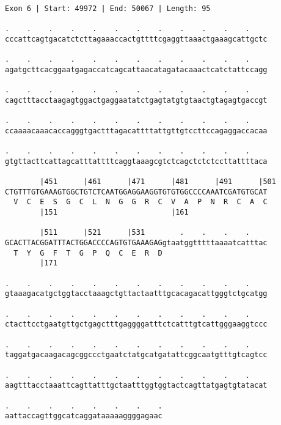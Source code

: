 \documentclass{article}
\begin{document}
\begin{Verbatim}
Exon 6 | Start: 49972 | End: 50067 | Length: 95
 
.    .    .    .    .    .    .    .    .    .    .    .    
cccattcagtgacatctcttagaaaccactgttttcgaggttaaactgaaagcattgctc
  
.    .    .    .    .    .    .    .    .    .    .    .    
agatgcttcacggaatgagaccatcagcattaacatagatacaaactcatctattccagg
  
.    .    .    .    .    .    .    .    .    .    .    .    
cagctttacctaagagtggactgaggaatatctgagtatgtgtaactgtagagtgaccgt
  
.    .    .    .    .    .    .    .    .    .    .    .    
ccaaaacaaacaccagggtgactttagacattttattgttgtccttccagaggaccacaa
  
.    .    .    .    .    .    .    .    .    .    .    .    
gtgttacttcattagcatttattttcaggtaaagcgtctcagctctctccttattttaca
  
        |451      |461      |471      |481      |491      |501
CTGTTTGTGAAAGTGGCTGTCTCAATGGAGGAAGGTGTGTGGCCCCAAATCGATGTGCAT
  V  C  E  S  G  C  L  N  G  G  R  C  V  A  P  N  R  C  A  C
        |151                          |161                  
  
        |511      |521      |531        .    .    .    .    
GCACTTACGGATTTACTGGACCCCAGTGTGAAAGAGgtaatggtttttaaaatcatttac
  T  Y  G  F  T  G  P  Q  C  E  R  D                        
        |171                                                
  
.    .    .    .    .    .    .    .    .    .    .    .    
gtaaagacatgctggtacctaaagctgttactaatttgcacagacattgggtctgcatgg
  
.    .    .    .    .    .    .    .    .    .    .    .    
ctacttcctgaatgttgctgagctttgaggggatttctcatttgtcattgggaaggtccc
  
.    .    .    .    .    .    .    .    .    .    .    .    
taggatgacaagacagcggccctgaatctatgcatgatattcggcaatgtttgtcagtcc
  
.    .    .    .    .    .    .    .    .    .    .    .    
aagtttacctaaattcagttatttgctaatttggtggtactcagttatgagtgtatacat
  
.    .    .    .    .    .    .    .
aattaccagttggcatcaggataaaaaggggagaac
\end{Verbatim}
\newpage
\end{document}
